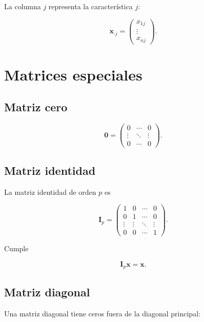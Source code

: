 \documentclass[
  spanish,
  10.5pt,
  letterpaper,
  DIV=11,
  numbers=noendperiod,
  oneside,
  open=any]{scrreprt}
\theoremstyle{definition}
\theoremstyle{definition}
\theoremstyle{plain}
\theoremstyle{remark}
\begin{document}
La columna \(j\) representa la característica \(j\):

\[
\mathbf{x}_{\cdot j}
=
\begin{pmatrix}
x_{1j}\\
\vdots\\
x_{nj}
\end{pmatrix}.
\]

\section*{Matrices especiales}\label{matrices-especiales}


\subsection*{Matriz cero}\label{matriz-cero}

\[
\mathbf{0}
=
\begin{pmatrix}
0 & \cdots & 0\\
\vdots & \ddots & \vdots\\
0 & \cdots & 0
\end{pmatrix}.
\]

\subsection*{Matriz identidad}\label{matriz-identidad}

La matriz identidad de orden \(p\) es

\[
\mathbf{I}_p
=
\begin{pmatrix}
1 & 0 & \cdots & 0\\
0 & 1 & \cdots & 0\\
\vdots & \vdots & \ddots & \vdots\\
0 & 0 & \cdots & 1
\end{pmatrix}.
\]

Cumple

\[
\mathbf{I}_p\mathbf{x}=\mathbf{x}.
\]

\subsection*{Matriz diagonal}\label{matriz-diagonal}

Una matriz diagonal tiene ceros fuera de la diagonal principal:
\end{document}
